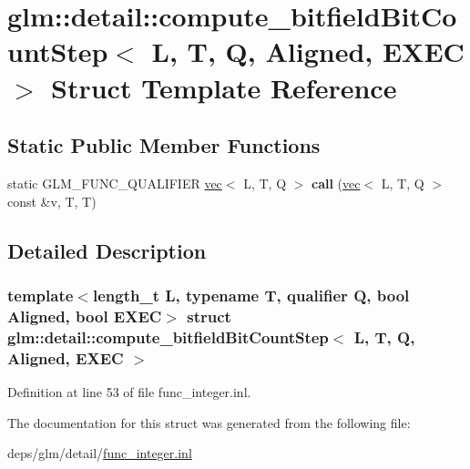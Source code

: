 \hypertarget{structglm_1_1detail_1_1compute__bitfieldBitCountStep}{}\section{glm\+:\+:detail\+:\+:compute\+\_\+bitfield\+Bit\+Count\+Step$<$ L, T, Q, Aligned, E\+X\+EC $>$ Struct Template Reference}
\label{structglm_1_1detail_1_1compute__bitfieldBitCountStep}
\subsection*{Static Public Member Functions}
\begin{DoxyCompactItemize}
\item 
\mbox{\label{structglm_1_1detail_1_1compute__bitfieldBitCountStep_a6dd989f9de4e8dbe2af6cf3cae352778}} 
static G\+L\+M\+\_\+\+F\+U\+N\+C\+\_\+\+Q\+U\+A\+L\+I\+F\+I\+ER \hyperlink{structglm_1_1vec}{vec}$<$ L, T, Q $>$ {\bfseries call} (\hyperlink{structglm_1_1vec}{vec}$<$ L, T, Q $>$ const \&v, T, T)
\end{DoxyCompactItemize}


\subsection{Detailed Description}
\subsubsection*{template$<$length\+\_\+t L, typename T, qualifier Q, bool Aligned, bool E\+X\+EC$>$\newline
struct glm\+::detail\+::compute\+\_\+bitfield\+Bit\+Count\+Step$<$ L, T, Q, Aligned, E\+X\+E\+C $>$}



Definition at line 53 of file func\+\_\+integer.\+inl.



The documentation for this struct was generated from the following file\+:\begin{DoxyCompactItemize}
\item 
deps/glm/detail/\hyperlink{func__integer_8inl}{func\+\_\+integer.\+inl}\end{DoxyCompactItemize}
